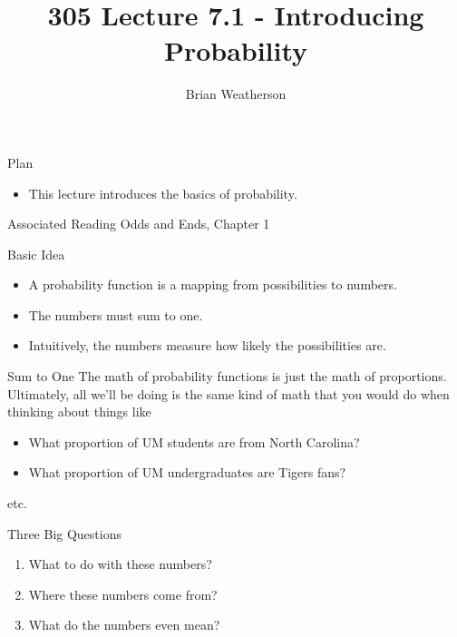 \documentclass[
  ignorenonframetext,
]{beamer}
\title{305 Lecture 7.1 - Introducing Probability}
\author{Brian Weatherson}
\date{}
\providecommand{\tightlist}{%
  \setlength{\itemsep}{0pt}\setlength{\parskip}{0pt}}
\renewcommand{\,}{\text{, }}
\begin{document}
\frame{\titlepage}

\begin{frame}{Plan}
\protect\hypertarget{plan}{}
\begin{itemize}
\tightlist
\item
  This lecture introduces the basics of probability.
\end{itemize}
\end{frame}

\begin{frame}{Associated Reading}
\protect\hypertarget{associated-reading}{}
Odds and Ends, Chapter 1
\end{frame}

\begin{frame}{Basic Idea}
\protect\hypertarget{basic-idea}{}
\begin{itemize}
\tightlist
\item
  A probability function is a mapping from possibilities to numbers.
\item
  The numbers must sum to one.
\item
  Intuitively, the numbers measure how likely the possibilities are.
\end{itemize}
\end{frame}

\begin{frame}{Sum to One}
\protect\hypertarget{sum-to-one}{}
The math of probability functions is just the math of proportions.
Ultimately, all we'll be doing is the same kind of math that you would
do when thinking about things like

\begin{itemize}
\tightlist
\item
  What proportion of UM students are from North Carolina?
\item
  What proportion of UM undergraduates are Tigers fans?
\end{itemize}

etc.
\end{frame}

\begin{frame}{Three Big Questions}
\protect\hypertarget{three-big-questions}{}
\begin{enumerate}[<+->]
\tightlist
\item
  What to do with these numbers?
\item
  Where these numbers come from?
\item
  What do the numbers even mean?
\end{enumerate}
\end{frame}
\end{document}
